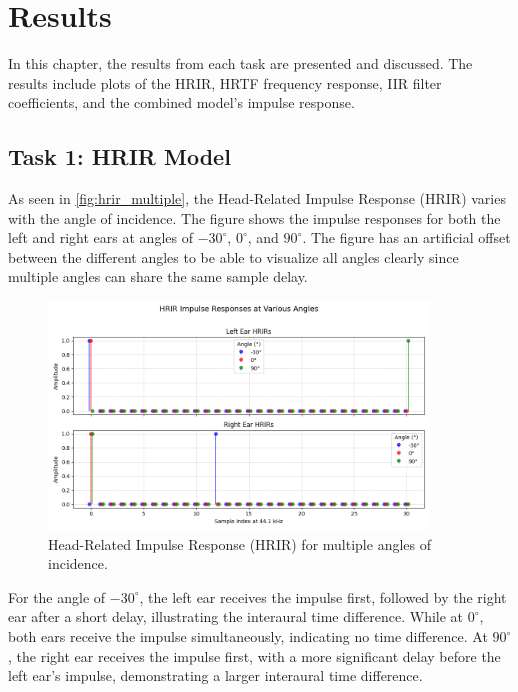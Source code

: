 \chapter{Results}
\label{ch:results}

In this chapter, the results from each task are presented and discussed. The results include plots of the HRIR, HRTF frequency response, IIR filter coefficients, and the combined model's impulse response. 

\section{Task 1: HRIR Model}
\label{sec:results_task1}

As seen in \autoref{fig:hrir_multiple}, the Head-Related Impulse Response (HRIR) varies with the angle of incidence. The figure shows the impulse responses for both the left and right ears at angles of \(-30^\circ\), \(0^\circ\), and \(90^\circ\). The figure has an artificial offset between the different angles to be able to visualize all angles clearly since multiple angles can share the same sample delay.

\begin{figure}[H]
    \centering
    \includegraphics[width=0.9\textwidth]{data/figures/task_1/hrir_impulse_responses_multiple_angles.png}
    \caption{Head-Related Impulse Response (HRIR) for multiple angles of incidence.}
    \label{fig:hrir_multiple}
\end{figure}

For the angle of \(-30^\circ\), the left ear receives the impulse first, followed by the right ear after a short delay, illustrating the interaural time difference. While at \(0^\circ\), both ears receive the impulse simultaneously, indicating no time difference. At \(90^\circ\), the right ear receives the impulse first, with a more significant delay before the left ear's impulse, demonstrating a larger interaural time difference.

